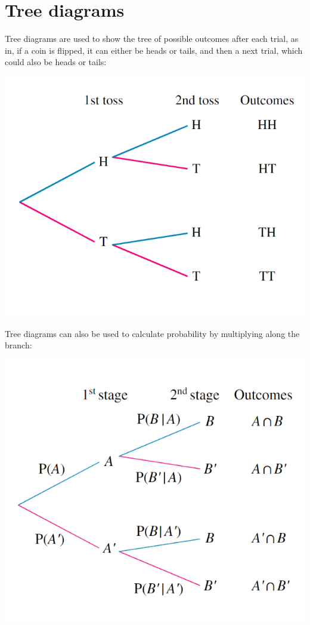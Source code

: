 \documentclass{book}
\begin{document}
\section{Tree diagrams}
Tree diagrams are used to show the tree of possible outcomes after each trial, as in, if a coin is flipped, it can either be heads or tails, and then a next trial, which could also be heads or tails:

\begin{center}
	\includegraphics[scale=0.5]{tree diagrams}
\end{center}

Tree diagrams can also be used to calculate probability by multiplying along the branch:

\begin{center}
	\includegraphics[scale=0.5]{tree diagrams probability}
\end{center}
\end{document}
